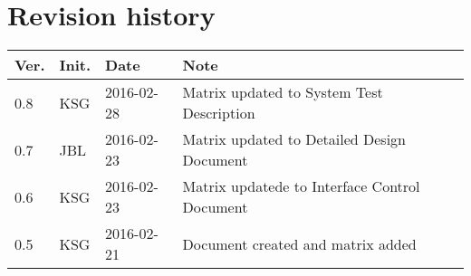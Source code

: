 \chapter*{Revision history}
\label{app:rev_his}


\begin{tabular}{b{1cm} b{1cm} b{2cm} b{8cm}}
    \textbf{Ver.} & \textbf{Init.} & \textbf{Date} & \textbf{Note} \\
    \hline
    0.8 & KSG & 2016-02-28 & Matrix updated to System Test Description \\
    0.7 & JBL & 2016-02-23 & Matrix updated to Detailed Design Document\\
    0.6 & KSG & 2016-02-23 & Matrix updatede to Interface Control Document\\
    0.5 & KSG & 2016-02-21 & Document created and matrix added \\
\end{tabular}
